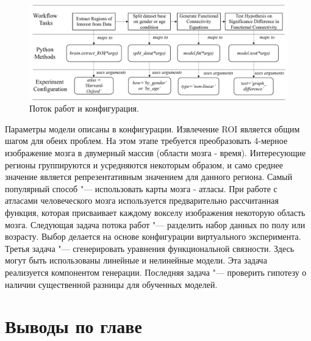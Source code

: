 \begin{figure}[ht]
    \centering
    \includegraphics[width=1.0\linewidth]{images/Workflow_conf.pdf}
    \caption{Поток работ и конфигурация.}\label{fig:workflow}
\end{figure}

Параметры модели описаны в конфигурации. Извлечение ROI является общим шагом для обеих проблем. На этом 
этапе требуется преобразовать 4-мерное изображение мозга в двумерный массив (области мозга - время). 
Интересующие регионы группируются и усредняются некоторым образом, и само среднее значение является 
репрезентативным значением для данного региона. Самый популярный способ "--- использовать карты мозга - атласы. 
При работе с атласами человеческого мозга используется предварительно рассчитанная функция, которая присваивает 
каждому вокселу изображения некоторую область мозга.
Следующая задача потока работ "--- разделить набор данных по полу или возрасту. Выбор делается на основе 
конфигурации виртуального эксперимента. Третья задача "--- сгенерировать уравнения функциональной связности. 
Здесь могут быть использованы линейные и нелинейные модели. Эта задача реализуется компонентом генерации. 
Последняя задача "--- проверить гипотезу о наличии существенной разницы для обученных моделей.

\section{Выводы по главе}\label{sect4_3}


\clearpage
